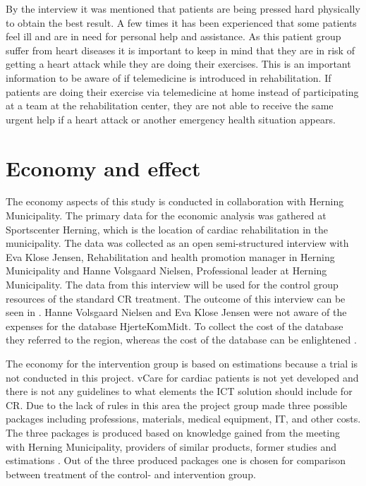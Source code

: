 By the interview it was mentioned that patients are being pressed hard physically to obtain the best result. A few times it has been experienced that some patients feel ill and are in need for personal help and assistance. As this patient group suffer from heart diseases it is important to keep in mind that they are in risk of getting a heart attack while they are doing their exercises. This is an important information to be aware of if telemedicine is introduced in rehabilitation. If patients are doing their exercise via telemedicine at home instead of participating at a team at the rehabilitation center, they are not able to receive the same urgent help if a heart attack or another emergency health situation appears.         

\section{Economy and effect}

The economy aspects of this study is conducted in collaboration with Herning Municipality. The primary data for the economic analysis was gathered at Sportscenter Herning, which is the location of cardiac rehabilitation in the municipality. The data was collected as an open semi-structured interview with Eva Klose Jensen, Rehabilitation and health promotion manager in Herning Municipality and Hanne Volsgaard Nielsen, Professional leader at Herning Municipality. The data from this interview will be used for the control group resources of the standard CR treatment. The outcome of this interview can be seen in . Hanne Volsgaard Nielsen and Eva Klose Jensen were not aware of the expenses for the database HjerteKomMidt. To collect the cost of the database they referred to the region, whereas the cost of the database can be enlightened \cite{hjerteKomMidt}.

The economy for the intervention group is based on estimations because a trial is not conducted in this project. vCare for cardiac patients is not yet developed and there is not any guidelines to what elements the ICT solution should include for CR. Due to the lack of rules in this area the project group made three possible packages including professions, materials, medical equipment, IT, and other costs. The three packages is produced based on knowledge gained from the meeting with Herning Municipality, providers of similar products, former studies and estimations \cite{sofoklis, costeffect, effects, usingeffect}. Out of the three produced packages one is chosen for comparison between treatment of the control- and intervention group.

